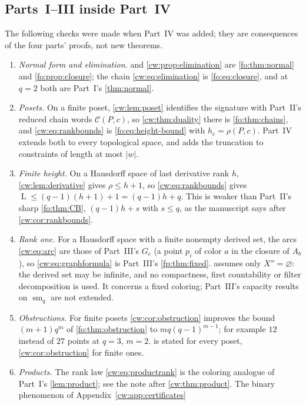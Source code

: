 \documentclass[11pt,letterpaper]{article}
\numberwithin{equation}{section}
\theoremstyle{definition}
\theoremstyle{remark}
\theoremstyle{definition}
\newcommand{\sm}{\operatorname{sm}}
\newcommand{\C}{\mathcal C}
\newcommand{\layers}{\operatorname{L}}
\newcommand{\len}[1]{\lvert #1\rvert}
\begin{document}
\subsection{Parts~I--III inside Part~IV}
\label{cw:sec:crosswalk}
The following checks were made when Part~IV was added; they are consequences
of the four parts' proofs, not new theorems.
\begin{enumerate}
\item \emph{Normal form and elimination.}  and
\cref{cw:prop:elimination} are \cref{fo:thm:normal} and
\cref{fo:prop:closure}; the chain \eqref{cw:eq:elimination} is
\eqref{fo:eq:closure}, and at $q=2$ both are Part~I's \cref{thm:normal}.
\item \emph{Posets.} On a finite poset, \cref{cw:lem:poset} identifies the
signature with Part~II's reduced chain words $\C(P,c)$, so
\cref{cw:thm:duality} there is \cref{fo:thm:chains}, and
\eqref{cw:eq:rankbounds} is \eqref{fo:eq:height-bound} with $h_c=\rho(P,c)$.
Part~IV extends both to every topological space, and adds the truncation to
constraints of length at most $\len{w}$.
\item \emph{Finite height.} On a Hausdorff space of last derivative rank $h$,
\cref{cw:lem:derivative} gives $\rho\le h+1$, so \eqref{cw:eq:rankbounds}
gives $\layers\le(q-1)(h+1)+1=(q-1)h+q$. This is weaker than Part~II's
sharp \cref{fo:thm:CB}, $(q-1)h+s$ with $s\le q$, as the manuscript says after
\cref{cw:cor:rankbounds}.
\item \emph{Rank one.} For a Hausdorff space with a finite nonempty derived
set, the arcs \eqref{cw:eq:arc} are those of Part~III's $G_c$ (a point $p_i$
of color $a$ in the closure of $A_b$), so \eqref{cw:eq:graphformula} is
Part~III's \cref{fp:thm:fixed}.  assumes only
$X''=\varnothing$: the derived set may be infinite, and no compactness,
first countability or filter decomposition is used. It concerns a fixed
coloring; Part~III's capacity results on $\sm_q$ are not extended.
\item \emph{Obstructions.} For finite posets \cref{cw:cor:obstruction}
improves the bound $(m+1)q^m$ of \cref{fo:thm:obstruction} to
$mq(q-1)^{m-1}$; for example $12$ instead of $27$ points at $q=3$, $m=2$.
 is stated for every poset,
\cref{cw:cor:obstruction} for finite ones.
\item \emph{Products.} The rank law \eqref{cw:eq:productrank} is the
coloring analogue of Part~I's \cref{lem:product}; see the note after
\cref{cw:thm:product}. The binary phenomenon of Appendix~\ref{cw:app:certificates}

\end{enumerate}
\end{document}
